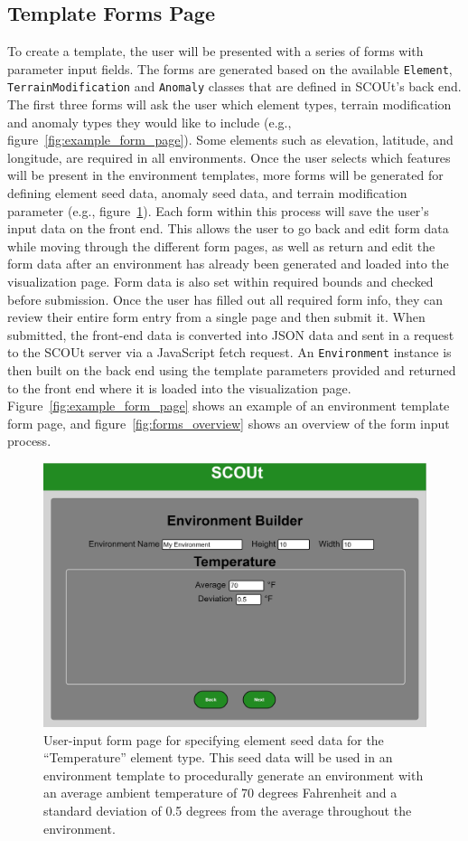 \subsection{Template Forms Page} \label{subsec:template_forms_page}
To create a template, the user will be presented with a series of forms with parameter input fields.
The forms are generated based on the available \texttt{Element}, \texttt{TerrainModification} and \texttt{Anomaly} classes that are defined in SCOUt's back end.
The first three forms will ask the user which element types, terrain modification and anomaly types they would like to include (e.g., figure~\ref{fig:example_form_page}).
Some elements such as elevation, latitude, and longitude, are required in all environments.
Once the user selects which features will be present in the environment templates, more forms will be generated for defining element seed data, anomaly seed data, and terrain modification parameter (e.g., figure~\ref{fig:example_form_page2}).
Each form within this process will save the user’s input data on the front end.
This allows the user to go back and edit form data while moving through the different form pages, as well as return and edit the form data after an environment has already been generated and loaded into the visualization page.
Form data is also set within required bounds and checked before submission.
Once the user has filled out all required form info, they can review their entire form entry from a single page and then submit it.
When submitted, the front-end data is converted into JSON data and sent in a request to the SCOUt server via a JavaScript fetch request.
An \texttt{Environment} instance is then built on the back end using the template parameters provided and returned to the front end where it is loaded into the visualization page.
Figure~\ref{fig:example_form_page} shows an example of an environment template form page, and figure~\ref{fig:forms_overview} shows an overview of the form input process.

\begin{figure}[!htb]
  \centering
  \includegraphics[width=0.725\columnwidth]{Figures/Visualizer/Forms/Visualizer-Forms-ElementSeed-Temperature.JPG}
  \caption[GUI Element Seed Form]{User-input form page for specifying element seed data for the ``Temperature'' element type. This seed data will be used in an environment template to procedurally generate an environment with an average ambient temperature of 70 degrees Fahrenheit and a standard deviation of 0.5 degrees from the average throughout the environment.}
  \label{fig:example_form_page2}
\end{figure}

